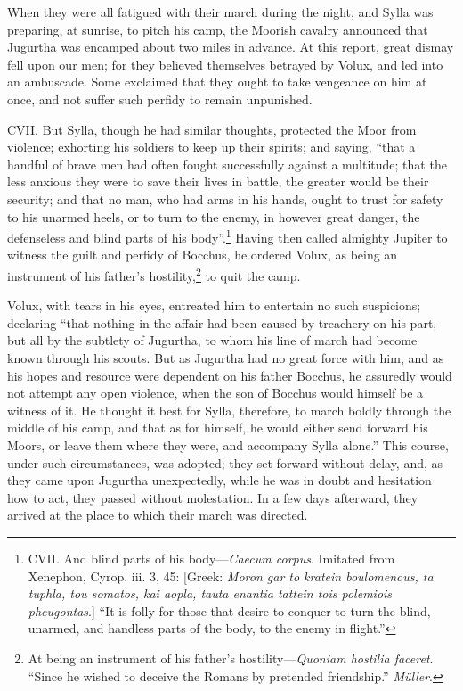 When they were all fatigued with their march during the night, and
Sylla was preparing, at sunrise, to pitch his camp, the Moorish
cavalry announced that Jugurtha was encamped about two miles in
advance. At this report, great dismay fell upon our men; for they
believed themselves betrayed by Volux, and led into an ambuscade. Some
exclaimed that they ought to take vengeance on him at once, and not
suffer such perfidy to remain unpunished.

CVII. But Sylla, though he had similar thoughts, protected the Moor
from violence; exhorting his soldiers to keep up their spirits; and
saying, ``that a handful of brave men had often fought successfully
against a multitude; that the less anxious they were to save their
lives in battle, the greater would be their security; and that no man,
who had arms in his hands, ought to trust for safety to his unarmed
heels, or to turn to the enemy, in however great danger, the
defenseless and blind parts of his body''.\footnote{CVII. And blind parts of his body—\emph{Caecum corpus}. Imitated
from Xenephon, Cyrop. iii. 3, 45: [Greek: \emph{Moron gar to kratein
boulomenous, ta tuphla, tou somatos, kai aopla, tauta enantia
tattein tois polemiois pheugontas}.] ``It is folly for those that
desire to conquer to turn the blind, unarmed, and handless parts of
the body, to the enemy in flight.''} Having then called
almighty Jupiter to witness the guilt and perfidy of Bocchus, he
ordered Volux, as being an instrument of his father's hostility,\footnote{At being an instrument of his father's hostility—\emph{Quoniam
hostilia faceret}. ``Since he wished to deceive the Romans by pretended
friendship.'' \emph{Müller}.}
to quit the camp.

Volux, with tears in his eyes, entreated him to entertain no such
suspicions; declaring ``that nothing in the affair had been caused by
treachery on his part, but all by the subtlety of Jugurtha, to whom
his line of march had become known through his scouts. But as Jugurtha
had no great force with him, and as his hopes and resource were
dependent on his father Bocchus, he assuredly would not attempt any
open violence, when the son of Bocchus would himself be a witness of
it. He thought it best for Sylla, therefore, to march boldly through
the middle of his camp, and that as for himself, he would either send
forward his Moors, or leave them where they were, and accompany Sylla
alone.'' This course, under such circumstances, was adopted; they set
forward without delay, and, as they came upon Jugurtha unexpectedly,
while he was in doubt and hesitation how to act, they passed without
molestation. In a few days afterward, they arrived at the place to
which their march was directed.

